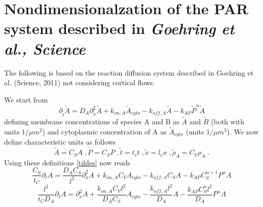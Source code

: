 \documentclass[a4paper,oneside,12pt]{article}
\begin{document}
\pagestyle{empty}%
\setcounter{page}{1}
\section*{Nondimensionalzation of the PAR system described in \textit{Goehring et al., Science}}
The following is based on the reaction diffusion system described in Goehring et al. (Science, 2011) not considering cortical flows.

We start from 
\begin{equation}
\label{tildes}
\partial_{\tilde t}\tilde A=D_A\partial_{\tilde x}^{2}\tilde A + k_{on,A}\tilde A_{cyto} - k_{off,A}\tilde A -k_{AP}\tilde P^{\alpha}\tilde A
\end{equation}
defining membrane concentrations of species A and B as $\tilde A$ and $\tilde B$ (both with units $1/\mu m^2$) and cytoplasmic concentration of A as $\tilde A_{cyto}$ (units $1/\mu m^3$). We now define characteristic units as follows \[\tilde A = C_SA\;, \tilde{P} = C_SP\;, \tilde{t} = t_ct\;, \tilde{x} = l_cx\;, \tilde{\rho}_A= C_V\rho_A\;.\] Using these definitions \cref{tildes} now reads \[\frac{C_S}{t_C}\partial_{t} A=\frac{D_AC_S}{l^2}\partial_{x}^{2} A + k_{on,A}C_V A_{cyto} - k_{off,A}C_S A-k_{AP}C_S^{\alpha+1} P^{\alpha} A\]
\[\frac{l^2}{t_CD_A}\partial_{t} A=\partial_{x}^{2} A + \frac{k_{on,A}C_Vl^2}{D_AC_S} A_{cyto} - \frac{k_{off,A}l^2}{D_A} A-\frac{k_{AP}C_S^\alpha l^2}{D_A} P^{\alpha} A\]
\end{document}
